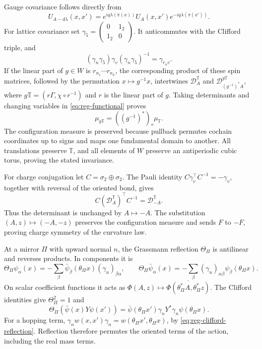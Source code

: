 \documentclass[11pt,letterpaper,reqno]{amsart}
\begin{document}
Gauge covariance follows directly from
\[
 U_{A-d\lambda}(x,x')
 =e^{iq\lambda(\pi(x))}U_A(x,x')e^{-iq\lambda(\pi(x'))}.
\]
For lattice covariance set
$\gamma_5=\left(\begin{smallmatrix}0&1_2\\1_2&0\end{smallmatrix}\right)$.
It anticommutes with the Clifford triple, and
\[
 (\gamma_n\gamma_5)\gamma_v(\gamma_n\gamma_5)^{-1}
 =\gamma_{r_nv}.
\]
If the linear part of $g\in W$ is $r_{n_1}\cdots r_{n_k}$, the
corresponding product of these spin matrices, followed by the
permutation $x\mapsto g^{-1}x$, intertwines $\mathcal D_A^{\mathbb T}$ and
$\mathcal D_{(g^{-1})^*A}^{g\mathbb T}$, where
$g\mathbb T=(r\Gamma,\chi\circ r^{-1})$ and $r$ is the linear part
of $g$. Taking determinants and changing
variables in \eqref{eq:reg-functional} proves
\[
 \mu_{g\mathbb T}=((g^{-1})^*)_*\mu_{\mathbb T}.
\]
The configuration measure is preserved because pullback permutes
cochain coordinates up to signs and maps one fundamental domain
to another. All translations preserve $\mathbb T$, and all elements
of $W$ preserve an antiperiodic cubic torus, proving the stated
invariance.

For charge conjugation let $C=\sigma_2\oplus\sigma_2$. The Pauli
identity $C\gamma_v^\top C^{-1}=-\gamma_v$, together with reversal
of the oriented bond, gives
\[
 C(\mathcal D_A^{\mathbb T})^\top C^{-1}=\mathcal D_{-A}^{\mathbb T}.
\]
Thus the determinant is unchanged by $A\mapsto-A$. The substitution
$(A,z)\mapsto(-A,-z)$ preserves the configuration measure and sends
$F$ to $-F$, proving charge symmetry of the curvature law.

At a mirror $\Pi$ with upward normal $n$, the Grassmann reflection
$\Theta_\Pi$ is antilinear and reverses products. In components it is
\begin{equation}\label{eq:reg-grassmann-reflection}
 \Theta_\Pi\psi_\alpha(x)
  =-\sum_\beta\bar\psi_\beta(\theta_\Pi x)(\gamma_n)_{\beta\alpha},
 \qquad
 \Theta_\Pi\bar\psi_\alpha(x)
  =-\sum_\beta(\gamma_n)_{\alpha\beta}\psi_\beta(\theta_\Pi x).
\end{equation}
On scalar coefficient functions it acts as
$\Phi(A,z)\mapsto\overline{\Phi(\theta_\Pi^*A,\theta_\Pi^*z)}$.
The Clifford identities give $\Theta_\Pi^2=1$ and
\begin{equation}\label{eq:reg-reflected-bilinear}
 \Theta_\Pi(\bar\psi(x)Y\psi(x'))
 =\bar\psi(\theta_\Pi x')\gamma_nY^*\gamma_n\psi(\theta_\Pi x).
\end{equation}
For a hopping term,
$\gamma_nw(x,x')\gamma_n=w(\theta_\Pi x',\theta_\Pi x)$, by
\eqref{eq:reg-clifford-reflection}. Reflection therefore permutes the
oriented terms of the action, including the real mass terms.
\end{document}

